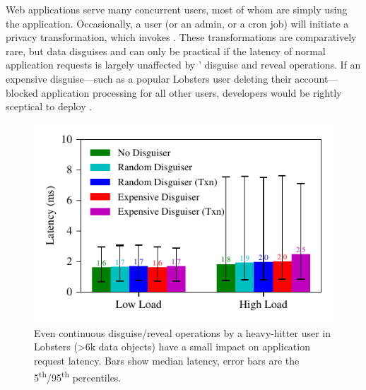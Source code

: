 %
Web applications serve many concurrent users, most of whom are simply using the
application.
%
Occasionally, a user (or an admin, or a cron job) will initiate a privacy
transformation, which invokes \sys.
%
These transformations are comparatively rare, but data disguises and \sys can
only be practical if the latency of normal application requests is largely
unaffected by \sys' disguise and reveal operations.
%
If an expensive disguise---such as a popular Lobsters user deleting their
account---blocked application processing for all other users, developers would
be rightly sceptical to deploy \sys.
%

\begin{figure}[t]
    \centering
        \includegraphics{figs/lobsters_concurrent_results}
        \caption{Even continuous disguise/reveal operations by a heavy-hitter user in Lobsters (>6k
          data objects) have a small impact on application request latency. Bars show median latency,
          error bars are the 5\textsuperscript{th}/95\textsuperscript{th} percentiles.}
        \label{f:concurrent-lobsters}
\end{figure}

